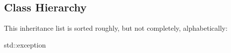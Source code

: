 \subsection{Class Hierarchy}
This inheritance list is sorted roughly, but not completely, alphabetically\+:\begin{DoxyCompactList}
\item std\+:\+:exception\begin{DoxyCompactList}
\item {}
\end{DoxyCompactList}
\end{DoxyCompactList}
